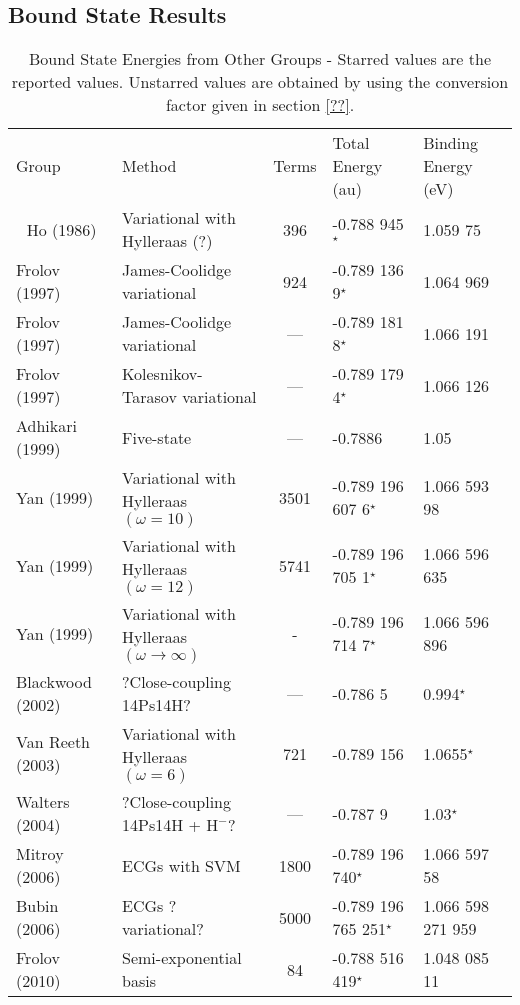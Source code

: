 \documentclass[preprint,showpacs,preprintnumbers,amsmath,amssymb]{revtex4}
\begin{document}
\subsection{Bound State Results}
\squeezetable  %
\begin{table}[H]
\begin{center}
\begin{ruledtabular}  %
\begin{tabular}{l l c l l}
Group & Method & Terms & Total Energy (au) & Binding Energy (eV)\\
\colrule  
Ho (1986) \cite{Ho1986} & Variational with Hylleraas (?) & 396 & -0.788 945$^\star$ & 1.059 75 \\
Frolov (1997) \cite{Frolov1997a} & James-Coolidge variational & 924 & -0.789 136 9$^\star$ & 1.064 969 \\
Frolov (1997) \cite{Frolov1997a} & James-Coolidge variational & --- & -0.789 181 8$^\star$ & 1.066 191 \\
Frolov (1997) \cite{Frolov1997b} & Kolesnikov-Tarasov variational & --- & -0.789 179 4$^\star$ & 1.066 126 \\
Adhikari (1999) \cite{Adhikari1999} & Five-state & --- & -0.7886 & 1.05 \\
Yan (1999) \cite{Yan1999} & Variational with Hylleraas $(\omega = 10)$ & 3501 & -0.789 196 607 6$^\star$ & 1.066 593 98 \\
Yan (1999) \cite{Yan1999} & Variational with Hylleraas $(\omega = 12)$ & 5741 & -0.789 196 705 1$^\star$ & 1.066 596 635 \\
Yan (1999) \cite{Yan1999} & Variational with Hylleraas $(\omega \rightarrow \infty)$ & - & -0.789 196 714 7$^\star$ & 1.066 596 896 \\
Blackwood (2002) \cite{Blackwood2002} & ?Close-coupling 14Ps14H? & --- & -0.786 5 & 0.994$^\star$ \\
Van Reeth (2003) \cite{VanReeth2003} & Variational with Hylleraas $(\omega = 6)$ & 721 & -0.789 156 & 1.0655$^\star$ \\
Walters (2004) \cite{Walters2004} & ?Close-coupling 14Ps14H + $\text{H}^-$? & --- & -0.787 9 & 1.03$^\star$\\
Mitroy (2006) \cite{Mitroy2006} & ECGs with SVM & 1800 & -0.789 196 740$^\star$ & 1.066 597 58 \\
Bubin (2006) \cite{Bubin2006} & ECGs ?variational? & 5000 & -0.789 196 765 251$^\star$ & 1.066 598 271 959 \\
Frolov (2010) \cite{Frolov2010} & Semi-exponential basis & 84 & -0.788 516 419$^\star$ & 1.048 085 11 \\
\end{tabular}
\end{ruledtabular}
\caption{Bound State Energies from Other Groups - Starred values are the reported values.  Unstarred values are obtained by using the conversion factor given in section \ref{??}.}
\label{tab:BoundEnergyOther}
\end{center}
\end{table}
\end{document}
